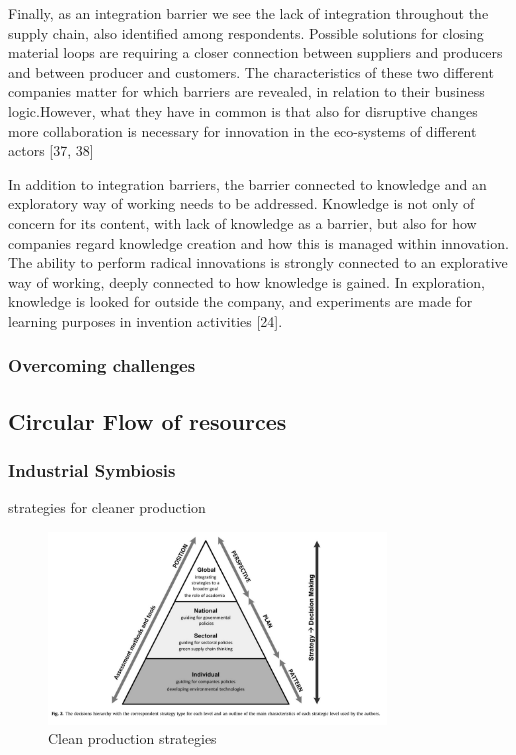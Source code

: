 Finally, as an integration barrier we see the lack of
integration throughout the supply chain, also identified among respondents. Possible solutions for closing material loops are requiring a closer connection between suppliers and producers and between producer and customers. The characteristics of these two different companies matter for which barriers are revealed, in relation to their business logic.However, what they have in common is that also for disruptive changes more collaboration is necessary for innovation in the eco-systems of different actors [37, 38]\par

In addition to integration barriers, the barrier connected to knowledge and an exploratory way of working needs to be addressed.
Knowledge is not only of concern for its content, with lack of knowledge as a barrier, but also for how companies regard knowledge creation and how this is managed within innovation. The ability to perform radical innovations is strongly connected to an explorative way of working, deeply connected to how knowledge is gained. In exploration, knowledge is looked for outside the company, and experiments are made for learning purposes in invention activities [24].\par


\parencite{Ritzen2017}

\subsubsection{Overcoming challenges}
\parencite{Bressanelli2018}

\parencite{Okorie}

\subsection{Circular Flow of resources}








\subsubsection{Industrial Symbiosis}



\parencite{Almeida2015}
strategies for cleaner production
\begin{figure}[h!]
    \centering
    \includegraphics[width=0.8\textwidth]{sections/asset/clean production.PNG}
    \caption{Clean production strategies}
    \label{fig:cp_stategies}
\end{figure}

